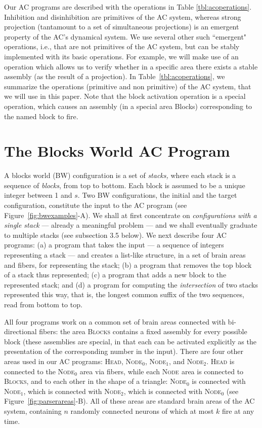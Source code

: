 \documentclass[letterpaper]{article}
\newcommand{\workzone}[1]{\mbox{\textsc{Node}$_{#1}$}\xspace}
\newcommand{\blocks}{\textsc{Blocks}\xspace}
\newcommand{\headzone}{\textsc{Head}\xspace}
\begin{document}
Our AC programs are described with the operations in Table \ref{tbl:acoperations}. Inhibition and disinhibition are primitives of the AC system, whereas strong projection (tantamount to a set of simultaneous projections) is an emergent property of the AC's dynamical system. We use several other such ``emergent" operations, i.e., that are not primitives of the AC system, but can be stably implemented with its basic operations. For example, we will make use of an operation which allows us to verify whether in a specific area there exists a stable assembly (as the result of a projection). In Table~\ref{tbl:acoperations}, we summarize the operations (primitive and non primitive) of the AC system, that we will use in this paper. Note that the block activation operation is a special operation, which causes an assembly (in a special area {\sc Blocks}) corresponding to the named block to fire. 
 
\section{The Blocks World AC Program}
A blocks world (BW) configuration is a set of {\em stacks,} where each stack is a sequence of {\em blocks}, from top to bottom.  Each block is assumed to be a unique integer between 1 and $s$. Two BW configurations, the initial and the target configuration, constitute the input to the AC program (see Figure~\ref{fig:bwexamples}-A).  We shall at first concentrate on {\em configurations with a single stack} --- already a meaningful problem --- and we shall eventually graduate to multiple stacks (see subsection 3.5 below).  We next describe four AC programs: (a) a program that takes the input --- a sequence of integers  representing a stack --- and creates a list-like structure, in a set of brain areas and fibers, for representing the stack; (b) a program that removes the top block of a stack thus represented; (c) a program that adds a new block to the represented stack; and (d) a program for computing the {\em intersection} of two stacks represented this way, that is, the longest common suffix of the two sequences, read from bottom to top. 

All four programs work on a common set of brain areas connected with bi-directional fibers:  the area \blocks contains a fixed assembly for every possible block (these assemblies are special, in that each can be activated explicitly as the presentation of the corresponding number in the input). There are four other areas used in our AC programs: \headzone, \workzone{0}, \workzone{1}, and \workzone{2}. \headzone is connected to the \workzone{0} area via fibers, while each \workzone{} area is connected to \blocks, and to each other in the shape of a triangle: \workzone{0} is connected with \workzone{1}, which is connected with \workzone{2}, which is connected with \workzone{0} (see Figure~\ref{fig:parserareas}-B). All of these areas are standard brain areas of the AC system, containing $n$ randomly connected neurons of which at most $k$ fire at any time.
\end{document}
